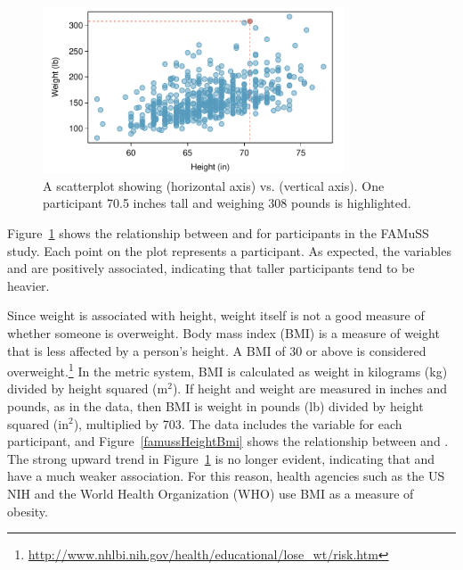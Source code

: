 
\begin{figure}[h!]
\centering
\includegraphics[width=0.8\textwidth]
{ch_intro_to_data_oi_biostat/figures/famussHeightWeight/famussHeightWeight}
\caption{A scatterplot showing  (horizontal axis) vs.  (vertical axis). One participant 70.5 inches tall and weighing 308 pounds is highlighted.}
\label{famussHeightWeight}
\end{figure}

Figure~\ref{famussHeightWeight} shows the relationship between  and  for participants in the FAMuSS study.  Each point on the plot represents a participant. As expected, the variables  and  are positively associated, indicating that taller participants tend to be heavier.  

Since weight is associated with height, weight itself is not a good measure of whether someone is overweight. Body mass index (BMI) is a measure of weight that is less affected by a person's height. A BMI of 30 or above is considered overweight.\footnote{\url{http://www.nhlbi.nih.gov/health/educational/lose_wt/risk.htm}} In the metric system, BMI is calculated as weight in kilograms (kg) divided by height squared ($\textrm {m}^{2}$). If height and weight are measured in inches and pounds, as in the  data, then BMI is weight in pounds (lb) divided by height squared ($\textrm {in}^{2}$), multiplied by 703. The  data includes the variable  for each participant, and Figure~\ref{famussHeightBmi} shows the relationship between  and . The strong upward trend in Figure~\ref{famussHeightWeight} is no longer evident, indicating that  and  have a much weaker association. For this reason, health agencies such as the US NIH and the World Health Organization (WHO) use BMI as a measure of obesity. 

